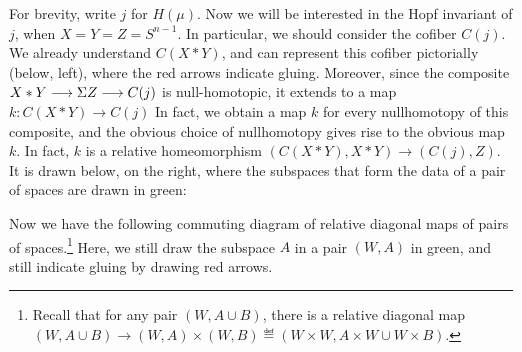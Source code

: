 For brevity, write $j$ for $H(\mu)$. Now we will be interested in the Hopf invariant of $j$, when $X=Y=Z=S^{n-1}$. In particular, we should consider the cofiber $C(j)$. We already understand $C(X\ast Y)$, and can represent this cofiber pictorially (below, left), where the red arrows indicate gluing. Moreover, since the composite $X \ast Y \longrightarrow \Sigma Z \longrightarrow C(j)$ is null-homotopic, it extends to a  map $k:C(X\ast Y)\to C(j)$
In fact, we obtain a map $k$ for every nullhomotopy of this composite, and the obvious choice of nullhomotopy gives rise to the obvious map $k$.
In fact, $k$ is a relative homeomorphism $(C(X\ast Y),X\ast Y)\to (C(j),Z)$. It is drawn below, on the right, where the subspaces that form the data of a pair of spaces are drawn in green:
\begin{center}
\end{center}
%
%
Now we have the following commuting diagram of relative diagonal maps of pairs of spaces.\footnote{Recall that for any pair $(W,A\cup B)$, there is a relative diagonal map $(W,A\cup B)\to (W,A)\times (W,B)\eqdef(W\times W,A\times W\cup W\times B)$.} Here, we still draw the subspace $A$ in a pair $(W,A)$ in green, and still indicate gluing by drawing red arrows.
